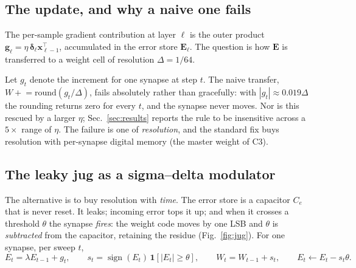 \documentclass[11pt]{article}
\newcommand{\x}{\bm x}
\newcommand{\bdelta}{\bm\delta}
\newcommand{\E}{\bm E}
\begin{document}
\subsection{The update, and why a naive one fails}

The per-sample gradient contribution at layer $\ell$ is the outer product $\bm g_\ell = \eta\,
\bdelta_\ell \x_{\ell-1}^{\!\top}$, accumulated in the error store $\E_\ell$. The question is how
$\E$ is transferred to a weight cell of resolution $\Delta = 1/64$.

Let $g_t$ denote the increment for one synapse at step $t$. The naive transfer, $W \mathrel{+}=
\mathrm{round}(g_t/\Delta)$, fails absolutely rather than gracefully: with $|g_t| \approx 0.019\Delta$
the rounding returns zero for every $t$, and the synapse never moves. Nor is this rescued by a larger
$\eta$; Sec.~\ref{sec:results} reports the rule to be insensitive across a $5\times$ range of $\eta$.
The failure is one of \emph{resolution}, and the standard fix buys resolution with per-synapse digital
memory (the master weight of C3).

\subsection{The leaky jug as a sigma--delta modulator}\label{sec:jug}

The alternative is to buy resolution with \emph{time}. The error store is a capacitor $C_e$ that is
never reset. It leaks; incoming error tops it up; and when it crosses a threshold $\theta$ the synapse
\emph{fires}: the weight code moves by one LSB and $\theta$ is \emph{subtracted} from the capacitor,
retaining the residue (Fig.~\ref{fig:jug}). For one synapse, per sweep $t$,
\begin{equation}
E_t = \lambda E_{t-1} + g_t, \qquad
s_t = \operatorname{sign}(E_t)\,\mathbf{1}\!\left[|E_t| \ge \theta\right], \qquad
W_t = W_{t-1} + s_t, \qquad
E_t \leftarrow E_t - s_t\theta .
\label{eq:jug}
\end{equation}
\end{document}
